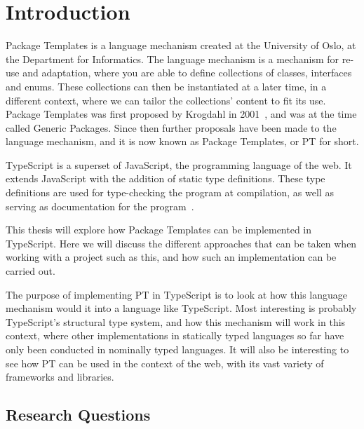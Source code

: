 
\chapter{Introduction}\label{ch:introduction}


Package Templates is a language mechanism created at the University of Oslo, at the Department for Informatics.
The language mechanism is a mechanism for re-use and adaptation, where you are able to define collections of classes, interfaces and enums.
These collections can then be instantiated at a later time, in a different context, where we can tailor the collections' content to fit its use.
Package Templates was first proposed by Krogdahl in 2001~\cite{krogdahl:GP}, and was at the time called Generic Packages.
Since then further proposals have been made to the language mechanism, and it is now known as Package Templates, or PT for short.

TypeScript is a superset of JavaScript, the programming language of the web.
It extends JavaScript with the addition of static type definitions.
These type definitions are used for type-checking the program at compilation, as well as serving as documentation for the program~\cite{tswebsite}.

This thesis will explore how Package Templates can be implemented in TypeScript.
Here we will discuss the different approaches that can be taken when working with a project such as this, and how such an implementation can be carried out.

The purpose of implementing PT in TypeScript is to look at how this language mechanism would it into a language like TypeScript.
Most interesting is probably TypeScript's structural type system, and how this mechanism will work in this context, where other implementations in statically typed languages so far have only been conducted in nominally typed languages.
It will also be interesting to see how PT can be used in the context of the web, with its vast variety of frameworks and libraries.

\section{Research Questions}\label{sec:research-questions}

